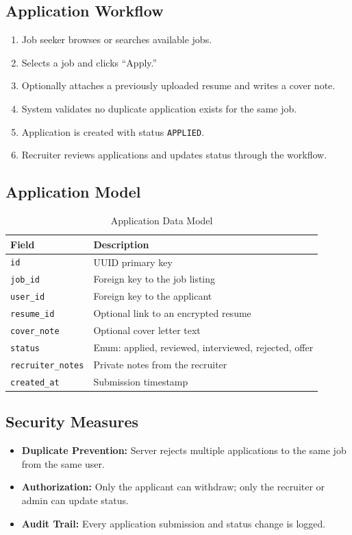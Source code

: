 \documentclass[12pt,a4paper]{article}
\begin{document}
\subsection{Application Workflow}
\begin{enumerate}
  \item Job seeker browses or searches available jobs.
  \item Selects a job and clicks ``Apply.''
  \item Optionally attaches a previously uploaded resume and writes a cover note.
  \item System validates no duplicate application exists for the same job.
  \item Application is created with status \texttt{APPLIED}.
  \item Recruiter reviews applications and updates status through the workflow.
\end{enumerate}

\subsection{Application Model}
\begin{table}[H]
\centering
\begin{tabular}{ll}
\toprule
\textbf{Field} & \textbf{Description} \\
\midrule
\texttt{id} & UUID primary key \\
\texttt{job\_id} & Foreign key to the job listing \\
\texttt{user\_id} & Foreign key to the applicant \\
\texttt{resume\_id} & Optional link to an encrypted resume \\
\texttt{cover\_note} & Optional cover letter text \\
\texttt{status} & Enum: applied, reviewed, interviewed, rejected, offer \\
\texttt{recruiter\_notes} & Private notes from the recruiter \\
\texttt{created\_at} & Submission timestamp \\
\bottomrule
\end{tabular}
\caption{Application Data Model}
\end{table}

\subsection{Security Measures}
\begin{itemize}
  \item \textbf{Duplicate Prevention:} Server rejects multiple applications to the same job from the same user.
  \item \textbf{Authorization:} Only the applicant can withdraw; only the recruiter or admin can update status.
  \item \textbf{Audit Trail:} Every application submission and status change is logged.
\end{itemize}
\end{document}
